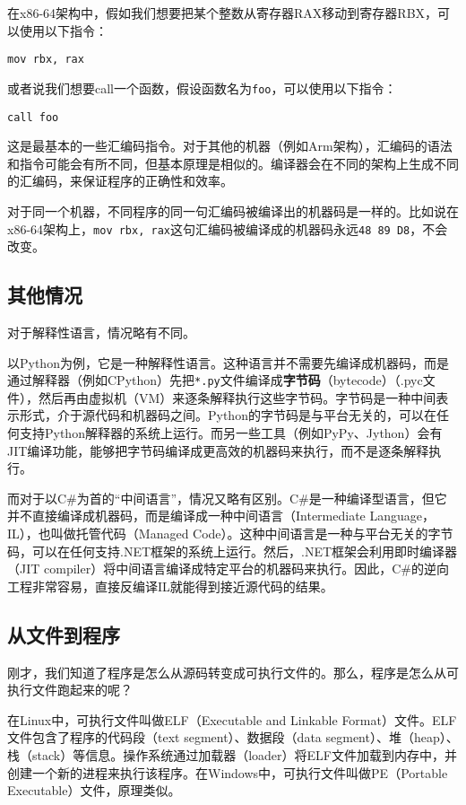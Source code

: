 在x86-64架构中，假如我们想要把某个整数从寄存器RAX移动到寄存器RBX，可以使用以下指令：
\begin{lstlisting}
mov rbx, rax
\end{lstlisting}
或者说我们想要call一个函数，假设函数名为\texttt{foo}，可以使用以下指令：
\begin{lstlisting}
call foo
\end{lstlisting}
这是最基本的一些汇编码指令。对于其他的机器（例如Arm架构），汇编码的语法和指令可能会有所不同，但基本原理是相似的。编译器会在不同的架构上生成不同的汇编码，来保证程序的正确性和效率。

对于同一个机器，不同程序的同一句汇编码被编译出的机器码是一样的。比如说在x86-64架构上，\texttt{mov rbx, rax}这句汇编码被编译成的机器码永远\texttt{48 89 D8}，不会改变。

\subsection{其他情况}

对于解释性语言，情况略有不同。

以Python为例，它是一种解释性语言。这种语言并不需要先编译成机器码，而是通过解释器（例如CPython）先把\texttt{*.py}文件编译成\textbf{字节码}（bytecode）（.pyc文件），然后再由虚拟机（VM）来逐条解释执行这些字节码。字节码是一种中间表示形式，介于源代码和机器码之间。Python的字节码是与平台无关的，可以在任何支持Python解释器的系统上运行。而另一些工具（例如PyPy、Jython）会有JIT编译功能，能够把字节码编译成更高效的机器码来执行，而不是逐条解释执行。

而对于以C\#为首的“中间语言”，情况又略有区别。C\#是一种编译型语言，但它并不直接编译成机器码，而是编译成一种中间语言（Intermediate Language，IL），也叫做托管代码（Managed Code）。这种中间语言是一种与平台无关的字节码，可以在任何支持.NET框架的系统上运行。然后，.NET框架会利用即时编译器（JIT compiler）将中间语言编译成特定平台的机器码来执行。因此，C\#的逆向工程非常容易，直接反编译IL就能得到接近源代码的结果。

\subsection{从文件到程序}

刚才，我们知道了程序是怎么从源码转变成可执行文件的。那么，程序是怎么从可执行文件跑起来的呢？

在Linux中，可执行文件叫做ELF（Executable and Linkable Format）文件。ELF文件包含了程序的代码段（text segment）、数据段（data segment）、堆（heap）、栈（stack）等信息。操作系统通过加载器（loader）将ELF文件加载到内存中，并创建一个新的进程来执行该程序。在Windows中，可执行文件叫做PE（Portable Executable）文件，原理类似。

